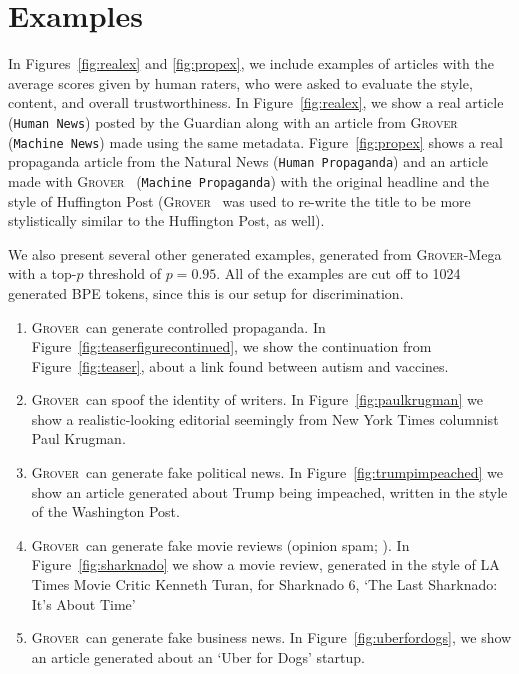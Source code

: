 \documentclass{article}
\newcommand{\modelname}{{\textsc{Grover}}}
\begin{document}
\section{Examples}
\label{sec:suppexamples}
In Figures~\ref{fig:realex} and \ref{fig:propex}, we include examples of articles with the average scores given by human raters, who were asked to evaluate the style, content, and overall trustworthiness.  In Figure~\ref{fig:realex}, we show a real article ({\tt\small Human News}) posted by the Guardian along with an article from \modelname~ ({\tt\small Machine News}) made using the same metadata.   Figure~\ref{fig:propex} shows a real propaganda article from the Natural News ({\tt\small Human Propaganda}) and an article made with \modelname~ ({\tt\small Machine Propaganda}) with the original headline and the style of Huffington Post (\modelname~ was used to re-write the title to be more stylistically similar to the Huffington Post, as well).

We also present several other generated examples, generated from \modelname-Mega with a top-$p$ threshold of $p{=}0.95$. All of the examples are cut off to 1024 generated BPE tokens, since this is our setup for discrimination. 
\begin{enumerate}[wide, leftmargin=10pt, labelwidth=!,labelindent=-2pt,itemsep=1pt,topsep=0pt,label=\textbf{\alph*}.]
    \item \modelname~can generate controlled propaganda. In Figure~\ref{fig:teaserfigurecontinued}, we show the continuation from Figure~\ref{fig:teaser}, about a link found between autism and vaccines.
    \item \modelname~can spoof the identity of writers. In Figure~\ref{fig:paulkrugman} we show a realistic-looking editorial seemingly from New York Times columnist Paul Krugman.
    \item \modelname~can generate fake political news. In Figure~\ref{fig:trumpimpeached} we show an article generated about Trump being impeached, written in the style of the Washington Post.
    \item \modelname~can generate fake movie reviews (opinion spam; \cite{ott2011finding}). In Figure~\ref{fig:sharknado} we show a movie review, generated in the style of LA Times Movie Critic Kenneth Turan, for Sharknado 6, `The Last Sharknado: It's About Time'
\item \modelname~can generate fake business news. In Figure~\ref{fig:uberfordogs}, we show an article generated about an `Uber for Dogs' startup.
\end{enumerate}
\end{document}
